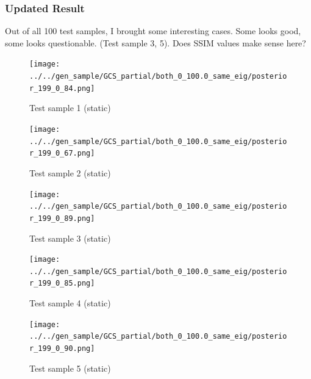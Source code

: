 \documentclass[
]{article}
\begin{document}
\subsubsection{Updated Result}\label{updated-result}

Out of all 100 test samples, I brought some interesting cases. Some
looks good, some looks questionable. (Test sample 3, 5). Does SSIM
values make sense here?

\begin{figure}[H]

{\centering \texttt{[image: ../../gen\_sample/GCS\_partial/both\_0\_100.0\_same\_eig/posterior\_199\_0\_84.png]}

}

\caption{Test sample 1 (static)}

\end{figure}%
\begin{figure}[H]

{\centering \texttt{[image: ../../gen\_sample/GCS\_partial/both\_0\_100.0\_same\_eig/posterior\_199\_0\_67.png]}

}

\caption{Test sample 2 (static)}

\end{figure}%
\begin{figure}[H]

{\centering \texttt{[image: ../../gen\_sample/GCS\_partial/both\_0\_100.0\_same\_eig/posterior\_199\_0\_89.png]}

}

\caption{Test sample 3 (static)}

\end{figure}%
\begin{figure}[H]

{\centering \texttt{[image: ../../gen\_sample/GCS\_partial/both\_0\_100.0\_same\_eig/posterior\_199\_0\_85.png]}

}

\caption{Test sample 4 (static)}

\end{figure}%
\begin{figure}[H]

{\centering \texttt{[image: ../../gen\_sample/GCS\_partial/both\_0\_100.0\_same\_eig/posterior\_199\_0\_90.png]}

}

\caption{Test sample 5 (static)}

\end{figure}%
\end{document}
